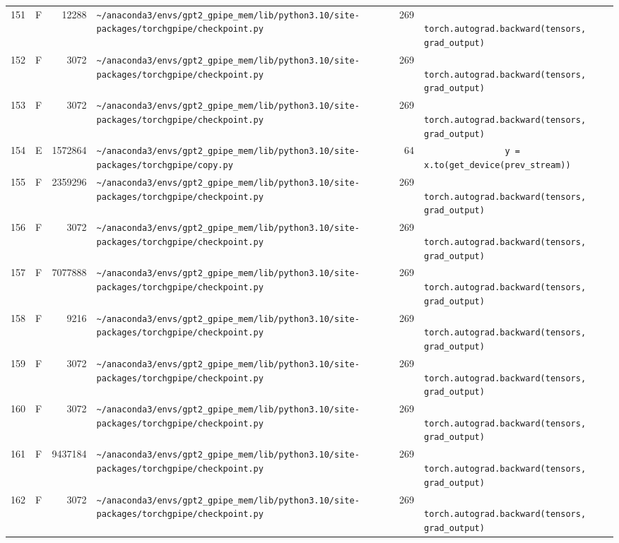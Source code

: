 \documentclass{article}
\begin{document}
\begin{longtable}{r l r p{6.5cm} r p{7.0cm}}
151 & F & 12288 & \lstinline|~/anaconda3/envs/gpt2_gpipe_mem/lib/python3.10/site-packages/torchgpipe/checkpoint.py| & 269 & \lstinline|            torch.autograd.backward(tensors, grad_output)| \\
152 & F & 3072 & \lstinline|~/anaconda3/envs/gpt2_gpipe_mem/lib/python3.10/site-packages/torchgpipe/checkpoint.py| & 269 & \lstinline|            torch.autograd.backward(tensors, grad_output)| \\
153 & F & 3072 & \lstinline|~/anaconda3/envs/gpt2_gpipe_mem/lib/python3.10/site-packages/torchgpipe/checkpoint.py| & 269 & \lstinline|            torch.autograd.backward(tensors, grad_output)| \\
154 & E & 1572864 & \lstinline|~/anaconda3/envs/gpt2_gpipe_mem/lib/python3.10/site-packages/torchgpipe/copy.py| & 64 & \lstinline|                y = x.to(get_device(prev_stream))| \\
155 & F & 2359296 & \lstinline|~/anaconda3/envs/gpt2_gpipe_mem/lib/python3.10/site-packages/torchgpipe/checkpoint.py| & 269 & \lstinline|            torch.autograd.backward(tensors, grad_output)| \\
156 & F & 3072 & \lstinline|~/anaconda3/envs/gpt2_gpipe_mem/lib/python3.10/site-packages/torchgpipe/checkpoint.py| & 269 & \lstinline|            torch.autograd.backward(tensors, grad_output)| \\
157 & F & 7077888 & \lstinline|~/anaconda3/envs/gpt2_gpipe_mem/lib/python3.10/site-packages/torchgpipe/checkpoint.py| & 269 & \lstinline|            torch.autograd.backward(tensors, grad_output)| \\
158 & F & 9216 & \lstinline|~/anaconda3/envs/gpt2_gpipe_mem/lib/python3.10/site-packages/torchgpipe/checkpoint.py| & 269 & \lstinline|            torch.autograd.backward(tensors, grad_output)| \\
159 & F & 3072 & \lstinline|~/anaconda3/envs/gpt2_gpipe_mem/lib/python3.10/site-packages/torchgpipe/checkpoint.py| & 269 & \lstinline|            torch.autograd.backward(tensors, grad_output)| \\
160 & F & 3072 & \lstinline|~/anaconda3/envs/gpt2_gpipe_mem/lib/python3.10/site-packages/torchgpipe/checkpoint.py| & 269 & \lstinline|            torch.autograd.backward(tensors, grad_output)| \\
161 & F & 9437184 & \lstinline|~/anaconda3/envs/gpt2_gpipe_mem/lib/python3.10/site-packages/torchgpipe/checkpoint.py| & 269 & \lstinline|            torch.autograd.backward(tensors, grad_output)| \\
162 & F & 3072 & \lstinline|~/anaconda3/envs/gpt2_gpipe_mem/lib/python3.10/site-packages/torchgpipe/checkpoint.py| & 269 & \lstinline|            torch.autograd.backward(tensors, grad_output)| \\

\end{longtable}
\end{document}
